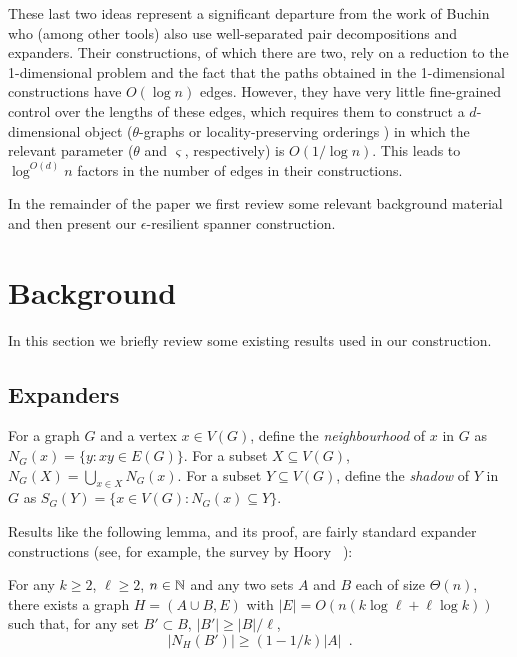 \documentclass{patmorin}
\begin{document}
These last two ideas represent a significant departure from the work of
Buchin \etal\ \cite{buchin.har-peled.ea:spanner} who 
(among other tools) also use well-separated
pair decompositions and expanders.  Their constructions, of
which there are two, rely on a reduction to the 1-dimensional problem
and the fact that the paths obtained in the 1-dimensional constructions 
have $O(\log n)$ edges.
However, they have very little fine-grained control over the lengths of
these edges, which requires them to construct a $d$-dimensional object
($\theta$-graphs  \cite{keil.gutwin:classes} or locality-preserving orderings \cite{chan.har-peled.ea:on}) in which the relevant
parameter ($\theta$ and $\varsigma$, respectively) is $O(1/\log n)$.  This leads
to $\log^{O(d)} n$ factors in the number of edges in their constructions.

In the remainder of the paper we first review some relevant background material and then present our $\epsilon$-resilient spanner construction.

\section{Background}

In this section we briefly review some existing results used in our
construction.

\subsection{Expanders}

For a graph $G$ and a vertex $x\in V(G)$, define the \emph{neighbourhood}
of $x$ in $G$ as $N_G(x) = \{ y: xy\in E(G)\}$.  For a subset $X\subseteq
V(G)$, $N_G(X)=\bigcup_{x\in X} N_G(x)$.  For a subset $Y\subseteq
V(G)$, define the \emph{shadow} of $Y$ in $G$ as $S_G(Y) = \{x\in V(G):
N_G(x)\subseteq Y\}$.

Results like the following lemma, and its proof, are fairly standard
expander constructions (see, for example, the survey by Hoory \etal\
\cite{hoory.linial.ea:expanders}):

\begin{lem}
   For any $k\ge 2$, $\ell\ge 2$, $n\in\mathbb{N}$ and any two sets $A$ and $B$
   each of size $\Theta(n)$, there exists a graph $H=(A\cup B,E)$
   with $|E|=O(n(k\log \ell + \ell\log k))$ such that, for any set $B'\subset B$, $|B'|\ge |B|/\ell$, \[ |N_H(B')| \ge (1-1/k)|A| \enspace . \]
\end{lem}
\end{document}
